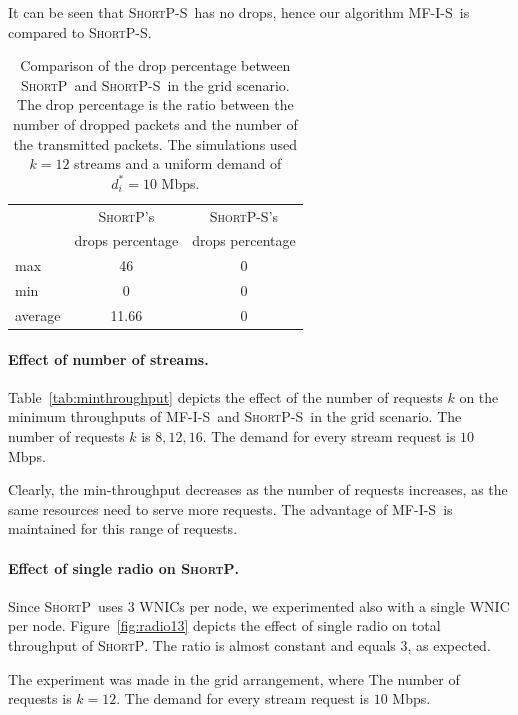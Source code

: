 \documentclass[11pt]{article}
\newenvironment{proof sketch}[1]{\noindent {\emph{Proof sketch of #1:}}}{\hfill \qed}
\newcommand{\algA}{\textsc{MF-I-S}}
\newcommand{\algB}{\textsc{ShortP}}
\newcommand{\algBS}{\textsc{ShortP-S}}
\newcommand{\algS}{\algB}
\begin{document}
It can be seen that \algBS\ has no drops, hence our algorithm \algA\
is compared to \algBS.
\begin{table}
  \centering\small
  \begin{tabular}{|| l || c | c ||}

    \hline
    & \algB 's            & \algBS 's \\
    &  drops percentage   & drops percentage \\
    \hline\hline
    max     & 46 & 0  \\
    min     & 0 & 0 \\
    average & 11.66  & 0 \\
    \hline
  \end{tabular}
  \caption{
    Comparison of the drop percentage between \algB\ and \algBS\ in the grid scenario. The drop percentage is
    the ratio between the number of
    dropped packets and the number of the transmitted packets. The simulations used $k=12$ streams and a uniform demand of $d_i^*=10$ Mbps.}
  \label{tab:dropsBS}
\end{table}


\paragraph{Effect of number of streams.}
Table~\ref{tab:minthroughput} depicts the effect of the number of
requests $k$ on the minimum throughputs of \algA\ and \algBS\ in the
grid scenario.  The number of requests $k$ is $8,12,16$. The demand
for every stream request is $10$ Mbps.

Clearly, the min-throughput decreases as the number of requests
increases, as the same resources need to serve more requests.  The
advantage of \algA\ is maintained for this range of requests.


\paragraph{Effect of single radio on \algS.}
Since \algS\ uses $3$ WNICs per node, we experimented also with a
single WNIC per node.  Figure~\ref{fig:radio13} depicts the effect of
single radio on total throughput of \algS.  The ratio is almost
constant and equals $3$, as expected.

The experiment was made in the grid arrangement, where The number of
requests is $k=12$.  The demand for every stream request is $10$ Mbps.
\end{document}
